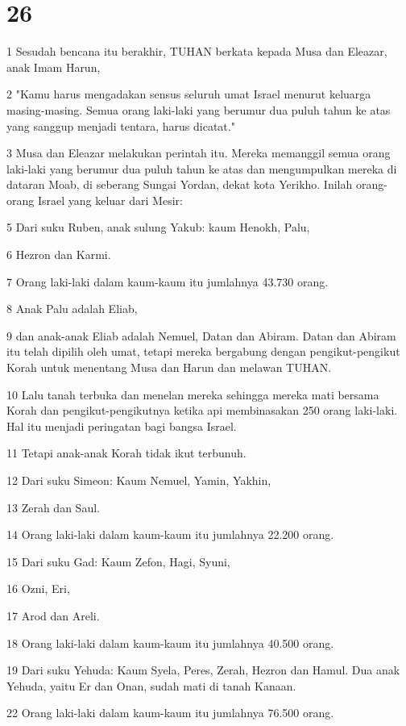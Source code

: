 \chapter{26}

\par 1 Sesudah bencana itu berakhir, TUHAN berkata kepada Musa dan Eleazar, anak Imam Harun,
\par 2 "Kamu harus mengadakan sensus seluruh umat Israel menurut keluarga masing-masing. Semua orang laki-laki yang berumur dua puluh tahun ke atas yang sanggup menjadi tentara, harus dicatat."
\par 3 Musa dan Eleazar melakukan perintah itu. Mereka memanggil semua orang laki-laki yang berumur dua puluh tahun ke atas dan mengumpulkan mereka di dataran Moab, di seberang Sungai Yordan, dekat kota Yerikho. Inilah orang-orang Israel yang keluar dari Mesir:
\par 5 Dari suku Ruben, anak sulung Yakub: kaum Henokh, Palu,
\par 6 Hezron dan Karmi.
\par 7 Orang laki-laki dalam kaum-kaum itu jumlahnya 43.730 orang.
\par 8 Anak Palu adalah Eliab,
\par 9 dan anak-anak Eliab adalah Nemuel, Datan dan Abiram. Datan dan Abiram itu telah dipilih oleh umat, tetapi mereka bergabung dengan pengikut-pengikut Korah untuk menentang Musa dan Harun dan melawan TUHAN.
\par 10 Lalu tanah terbuka dan menelan mereka sehingga mereka mati bersama Korah dan pengikut-pengikutnya ketika api membinasakan 250 orang laki-laki. Hal itu menjadi peringatan bagi bangsa Israel.
\par 11 Tetapi anak-anak Korah tidak ikut terbunuh.
\par 12 Dari suku Simeon: Kaum Nemuel, Yamin, Yakhin,
\par 13 Zerah dan Saul.
\par 14 Orang laki-laki dalam kaum-kaum itu jumlahnya 22.200 orang.
\par 15 Dari suku Gad: Kaum Zefon, Hagi, Syuni,
\par 16 Ozni, Eri,
\par 17 Arod dan Areli.
\par 18 Orang laki-laki dalam kaum-kaum itu jumlahnya 40.500 orang.
\par 19 Dari suku Yehuda: Kaum Syela, Peres, Zerah, Hezron dan Hamul. Dua anak Yehuda, yaitu Er dan Onan, sudah mati di tanah Kanaan.
\par 22 Orang laki-laki dalam kaum-kaum itu jumlahnya 76.500 orang.
